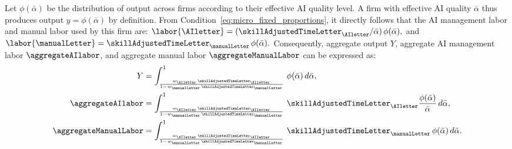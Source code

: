 Let $\phi(\bar{\alpha})$ be the distribution of output across firms according to their effective AI quality level. 
A firm with effective AI quality $\bar{\alpha}$ thus produces output $y = \phi(\bar{\alpha})$ by definition.
From Condition~\eqref{eq:micro_fixed_proportions}, it directly follows that the AI management labor and manual labor used by this firm are: $\labor{\AIletter} = (\skillAdjustedTimeLetter_{\AIletter}/\bar{\alpha})\,\phi(\bar{\alpha}),$ and $\labor{\manualLetter} = \skillAdjustedTimeLetter_{\manualLetter}\,\phi(\bar{\alpha}).$
Consequently, aggregate output $Y$, aggregate AI management labor $\aggregateAIlabor$, and aggregate manual labor $\aggregateManualLabor$ can be expressed as:
\begin{align}
Y & = \int_{\frac{w_{\AIletter}\,\skillAdjustedTimeLetter_{\AIletter}}{1 - w_{\manualLetter}\,\skillAdjustedTimeLetter_{\manualLetter}}}^{1}\,\phi(\bar{\alpha})\,d\bar{\alpha}, \label{eq:micro_Y}\\
\aggregateAIlabor & = \int_{\frac{w_{\AIletter}\,\skillAdjustedTimeLetter_{\AIletter}}{1 - w_{\manualLetter}\,\skillAdjustedTimeLetter_{\manualLetter}}}^{1}\,\skillAdjustedTimeLetter_{\AIletter}\frac{\phi(\bar{\alpha})}{\bar{\alpha}}\,d\bar{\alpha}, \label{eq:micro_M}\\
\aggregateManualLabor & = \int_{\frac{w_{\AIletter}\,\skillAdjustedTimeLetter_{\AIletter}}{1 - w_{\manualLetter}\,\skillAdjustedTimeLetter_{\manualLetter}}}^{1}\,\skillAdjustedTimeLetter_{\manualLetter}\,\phi(\bar{\alpha})\,d\bar{\alpha}.\label{eq:micro_H}
\end{align}

